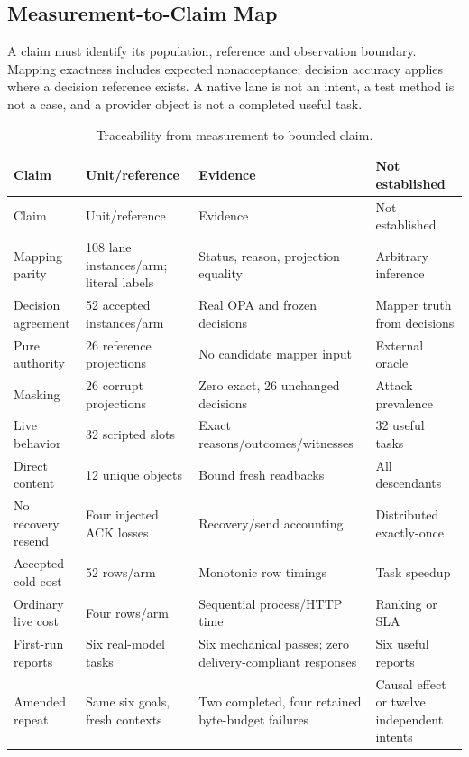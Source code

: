 \documentclass[11pt,letterpaper]{article}
\begin{document}
\subsection{Measurement-to-Claim Map}

A claim must identify its population, reference and observation boundary.
Mapping exactness includes expected nonacceptance; decision accuracy applies
where a decision reference exists. A native lane is not an intent, a test method
is not a case, and a provider object is not a completed useful task.

\begin{longtable}{@{}L{.22\linewidth}L{.27\linewidth}L{.25\linewidth}L{.17\linewidth}@{}}
\caption{Traceability from measurement to bounded claim.}\label{tab:claims}\\
\toprule Claim & Unit/reference & Evidence & Not established \\ \midrule
\endfirsthead
\toprule Claim & Unit/reference & Evidence & Not established \\ \midrule
\endhead
Mapping parity & 108 lane instances/arm; literal labels & Status, reason, projection equality & Arbitrary inference \\
Decision agreement & 52 accepted instances/arm & Real OPA and frozen decisions & Mapper truth from decisions \\
Pure authority & 26 reference projections & No candidate mapper input & External oracle \\
Masking & 26 corrupt projections & Zero exact, 26 unchanged decisions & Attack prevalence \\
Live behavior & 32 scripted slots & Exact reasons/outcomes/witnesses & 32 useful tasks \\
Direct content & 12 unique objects & Bound fresh readbacks & All descendants \\
No recovery resend & Four injected ACK losses & Recovery/send accounting & Distributed exactly-once \\
Accepted cold cost & 52 rows/arm & Monotonic row timings & Task speedup \\
Ordinary live cost & Four rows/arm & Sequential process/HTTP time & Ranking or SLA \\
First-run reports & Six real-model tasks & Six mechanical passes; zero delivery-compliant responses & Six useful reports \\
Amended repeat & Same six goals, fresh contexts & Two completed, four retained byte-budget failures & Causal effect or twelve independent intents \\

\end{longtable}
\end{document}
